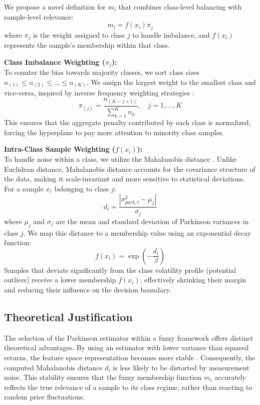 \documentclass[twoside]{article}
\begin{document}
	We propose a novel definition for $m_i$ that combines class-level balancing with sample-level relevance:
	\begin{equation}
		m_i = f(x_i) \pi_j
	\end{equation}
	where $\pi_j$ is the weight assigned to class $j$ to handle imbalance, and $f(x_i)$ represents the sample's membership within that class.
	
	\noindent\textbf{Class Imbalance Weighting ($\pi_j$):} \\
	To counter the bias towards majority classes, we sort class sizes $n_{(1)} \leq n_{(2)} \leq \dots \leq n_{(K)}$. We assign the largest weight to the smallest class and vice-versa, inspired by inverse frequency weighting strategies \cite{Diez2015}:
	\begin{equation}
		\pi_{(j)} = \frac{n_{(K-j+1)}}{\sum_{k=1}^K n_k}, \quad j=1,\dots,K
	\end{equation}
	This ensures that the aggregate penalty contributed by each class is normalized, forcing the hyperplane to pay more attention to minority class samples.
	
	\noindent\textbf{Intra-Class Sample Weighting ($f(x_i)$):} \\
	To handle noise within a class, we utilize the Mahalanobis distance \cite{Mohammadi2019}. Unlike Euclidean distance, Mahalanobis distance accounts for the covariance structure of the data, making it scale-invariant and more sensitive to statistical deviations. For a sample $x_i$ belonging to class $j$:
	\begin{equation}
		d_i = \frac{|\sigma_{park, t}^2 - \mu_j|}{\sigma_j}
	\end{equation}
	where $\mu_j$ and $\sigma_j$ are the mean and standard deviation of Parkinson variances in class $j$. We map this distance to a membership value using an exponential decay function:
	\begin{equation}
		f(x_i) = \exp\left( -\frac{d_i}{\beta} \right)
	\end{equation}
	Samples that deviate significantly from the class volatility profile (potential outliers) receive a lower membership $f(x_i)$, effectively shrinking their margin and reducing their influence on the decision boundary.
	
	\subsection{Theoretical Justification}
	The selection of the Parkinson estimator within a fuzzy framework offers distinct theoretical advantages. By using an estimator with lower variance than squared returns, the feature space representation becomes more stable \cite{Patton2011}. Consequently, the computed Mahalanobis distance $d_i$ is less likely to be distorted by measurement noise. This stability ensures that the fuzzy membership function $m_i$ accurately reflects the true relevance of a sample to its class regime, rather than reacting to random price fluctuations.
	
\end{document}

